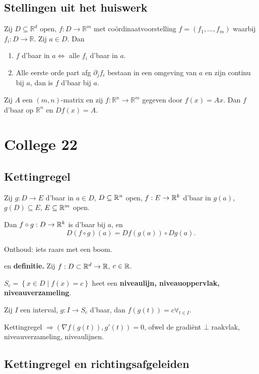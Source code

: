 \documentclass{2wa40summary}
\begin{document}
		\subsection{Stellingen uit het huiswerk}
			\theorem Zij $ D \subseteq \mathbb{R}^d $ open, $ f: D \rightarrow \mathbb{R}^m $ met co\"ordinaatvoorstelling $ f=(f_1,\dots,f_m) $ waarbij $ f_i : D \rightarrow \mathbb{R} $. Zij $ a \in D $. Dan
			\begin{enumerate}[(1)]
				\item $ f $ d'baar in $ a \Leftrightarrow $ alle $ f_i $ d'baar in $ a $.
				\item Alle eerste orde part afg $ \partial_j f_i $ bestaan in een omgeving van $ a $ en zijn continu bij $ a $, dan is $ f $ d'baar bij $ a $.
			\end{enumerate}
			\theorem Zij $ A $ een $ (m,n) $-matrix en zij $ f:\mathbb{R}^n \rightarrow \mathbb{R}^m $ gegeven door $ f(x)=Ax $. Dan $ f $ d'baar op $ \mathbb{R}^n $ en $ Df(x) = A $.
			
	\newpage
	\section{College 22}
		\subsection{Kettingregel}
			\theorem Zij $g:D \to E$ d'baar in $a \in D$, $D \subseteq \mathbb{R}^n$ open, $f:E \to \mathbb{R}^k$ d'baar in $g(a)$, $g(D) \subseteq E$, $E \subseteq \mathbb{R}^m$ open.
			
			Dan $f\circ g:D\to \mathbb{R}^k$ is d'baar bij $a$, en \[ D(f \circ g)(a) = Df(g(a))\circ Dg(a). \]
			
			Onthoud: iets raars met een boom.
			
			\gevolg en \textbf{definitie.} Zij $f:D \subset \mathbb{R}^d \to \mathbb{R}$, $c \in \mathbb{R}$. 
			
			$S_c = \left\{ x\in D \middle| f(x)=c \right\}$ heet een \textbf{niveaulijn, niveauoppervlak, niveauverzameling}.
			
			Zij $I$ een interval, $g: I\to S_c$ d'baar, dan $f(g(t))=c \forall_{t \in I}$.
			
			\opm Kettingregel $\Rightarrow (\nabla f(g(t)),g'(t)) = 0$, ofwel de gradi\"ent $\bot$ raakvlak, niveauverzameling, niveaulijnen.
			
		\subsection{Kettingregel en richtingsafgeleiden}
			
\end{document}
